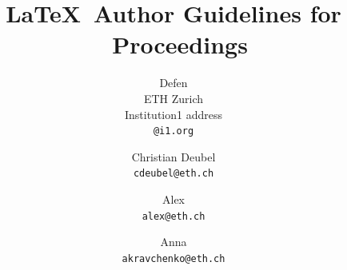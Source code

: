 \documentclass[10pt,twocolumn,letterpaper]{article}
\title{\LaTeX\ Author Guidelines for \confName~Proceedings}
\author{Defen\\
ETH Zurich\\
Institution1 address\\
{\tt\small @i1.org}
\and
Christian Deubel\\
{\tt\small cdeubel@eth.ch}
\and
Alex\\
{\tt\small alex@eth.ch}
\and
Anna\\
{\tt\small akravchenko@eth.ch}
}
\begin{document}
\maketitle
    



{
    \small
    
    
}

\end{document}
